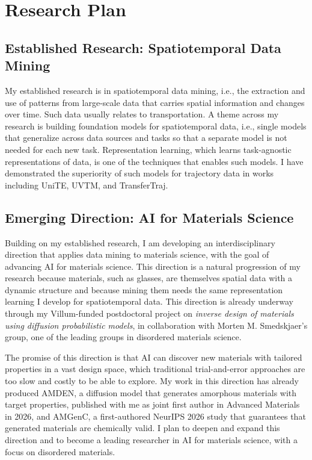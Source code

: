 \label{sec:research-plan}
\section*{Research Plan}
\subsection*{Established Research: Spatiotemporal Data Mining}
My established research is in spatiotemporal data mining, i.e., the extraction and use of patterns from large-scale data that carries spatial information and changes over time. Such data usually relates to transportation.
A theme across my research is building foundation models for spatiotemporal data, i.e., single models that generalize across data sources and tasks so that a separate model is not needed for each new task.
Representation learning, which learns task-agnostic representations of data, is one of the techniques that enables such models.
I have demonstrated the superiority of such models for trajectory data in works including UniTE, UVTM, and TransferTraj.

\subsection*{Emerging Direction: AI for Materials Science}
Building on my established research, I am developing an interdisciplinary direction that applies data mining to materials science, with the goal of advancing AI for materials science.
This direction is a natural progression of my research because materials, such as glasses, are themselves spatial data with a dynamic structure and because mining them needs the same representation learning I develop for spatiotemporal data.
This direction is already underway through my Villum-funded postdoctoral project on \textit{inverse design of materials using diffusion probabilistic models}, in collaboration with Morten M. Smedskjaer's group, one of the leading groups in disordered materials science.

\vspace{\entryskip}
The promise of this direction is that AI can discover new materials with tailored properties in a vast design space, which traditional trial-and-error approaches are too slow and costly to be able to explore.
My work in this direction has already produced AMDEN, a diffusion model that generates amorphous materials with target properties, published with me as joint first author in Advanced Materials in 2026, and AMGenC, a first-authored NeurIPS 2026 study that guarantees that generated materials are chemically valid.
I plan to deepen and expand this direction and to become a leading researcher in AI for materials science, with a focus on disordered materials.

